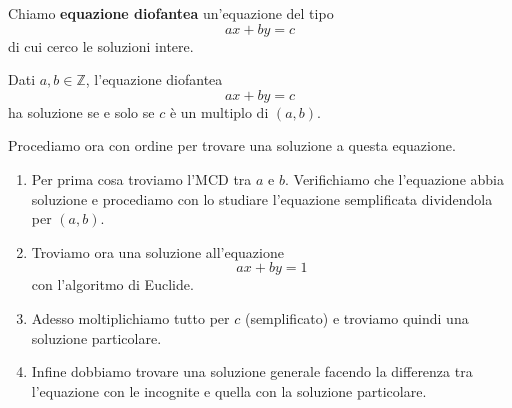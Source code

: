 \begin{definition}
	Chiamo \textbf{equazione diofantea} un'equazione del tipo
	\begin{equation*}
		ax + by = c
	\end{equation*}
	di cui cerco le soluzioni intere.
\end{definition}

\begin{theorem}
	Dati $a, b \in \mathbb{Z}$, l'equazione diofantea
	\begin{equation*}
		ax + by = c
	\end{equation*}
	ha soluzione se e solo se $c$ \`e un multiplo di $(a, b)$.
\end{theorem}

Procediamo ora con ordine per trovare una soluzione a questa equazione.
\begin{enumerate}
	\item Per prima cosa troviamo l'MCD tra $a$ e $b$. Verifichiamo che l'equazione abbia
	      soluzione e procediamo con lo studiare l'equazione semplificata dividendola per
	      $(a, b)$.
	\item Troviamo ora una soluzione all'equazione
	      \begin{equation*}
		      ax + by = 1
	      \end{equation*}
	      con l'algoritmo di Euclide.
	\item Adesso moltiplichiamo tutto per $c$ (semplificato) e troviamo quindi una soluzione
	      particolare.
	\item Infine dobbiamo trovare una soluzione generale facendo la differenza tra l'equazione
	      con le incognite e quella con la soluzione particolare.
\end{enumerate}

